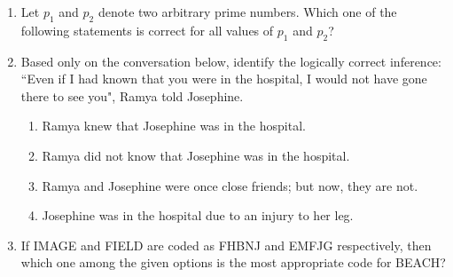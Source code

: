 \documentclass[journal,12pt,onecolumn]{IEEEtran}
\theoremstyle{remark}
\begin{document}
\begin{enumerate}
\begin{enumerate}
\end{enumerate}

\item Let $p_1$ and $p_2$ denote two arbitrary prime numbers. Which one of the following statements is correct for all values of $p_1$ and $p_2$?
\par\hfill{}
\begin{enumerate}
\end{enumerate}

\item Based only on the conversation below, identify the logically correct inference:\\

``Even if I had known that you were in the hospital, I would not have gone there to see you", Ramya told Josephine.
\par\hfill{}
\begin{enumerate}
\item Ramya knew that Josephine was in the hospital.
\item Ramya did not know that Josephine was in the hospital.
\item Ramya and Josephine were once close friends; but now, they are not.
\item Josephine was in the hospital due to an injury to her leg.
\end{enumerate}

\item If IMAGE and FIELD are coded as FHBNJ and EMFJG respectively, then which one among the given options is the most appropriate code for BEACH?
\par\hfill{}
\begin{enumerate}
\end{enumerate}


\end{enumerate}
\end{document}
